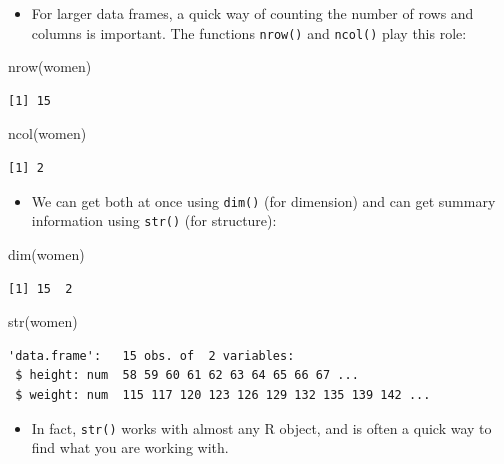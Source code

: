 \documentclass[
  9pt,
  a4paper,
  ignorenonframetext,
  notheorems]{beamer}
\newenvironment{Shaded}{\begin{snugshade}}{\end{snugshade}}
\newcommand{\FunctionTok}[1]{\textcolor[rgb]{0.28,0.35,0.67}{#1}}
\newcommand{\NormalTok}[1]{\textcolor[rgb]{0.00,0.23,0.31}{#1}}
\providecommand{\tightlist}{%
  \setlength{\itemsep}{0pt}\setlength{\parskip}{0pt}}\usepackage{longtable,booktabs,array}
\begin{document}
\begin{frame}[fragile]
\begin{itemize}
\tightlist
\item
  For larger data frames, a quick way of counting the number of rows and
  columns is important. The functions \texttt{nrow()} and
  \texttt{ncol()} play this role:
\end{itemize}

\begin{Shaded}
\begin{Highlighting}[]
\FunctionTok{nrow}\NormalTok{(women)}
\end{Highlighting}
\end{Shaded}

\begin{verbatim}
[1] 15
\end{verbatim}

\begin{Shaded}
\begin{Highlighting}[]
\FunctionTok{ncol}\NormalTok{(women)}
\end{Highlighting}
\end{Shaded}

\begin{verbatim}
[1] 2
\end{verbatim}

\begin{itemize}
\tightlist
\item
  We can get both at once using \texttt{dim()} (for dimension) and can
  get summary information using \texttt{str()} (for structure):
\end{itemize}

\begin{Shaded}
\begin{Highlighting}[]
\FunctionTok{dim}\NormalTok{(women)}
\end{Highlighting}
\end{Shaded}

\begin{verbatim}
[1] 15  2
\end{verbatim}

\begin{Shaded}
\begin{Highlighting}[]
\FunctionTok{str}\NormalTok{(women)}
\end{Highlighting}
\end{Shaded}

\begin{verbatim}
'data.frame':   15 obs. of  2 variables:
 $ height: num  58 59 60 61 62 63 64 65 66 67 ...
 $ weight: num  115 117 120 123 126 129 132 135 139 142 ...
\end{verbatim}

\begin{itemize}
\tightlist
\item
  In fact, \texttt{str()} works with almost any R object, and is often a
  quick way to find what you are working with.
\end{itemize}
\end{frame}
\end{document}
